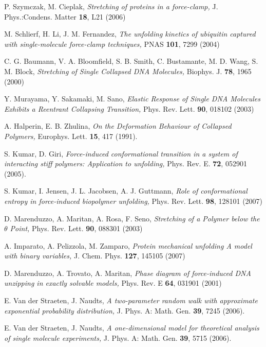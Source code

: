 \documentclass[doublecol,figures]{epl2}
\begin{document}
\begin{thebibliography}{99}
  P. Szymczak, M. Cieplak, {\sl Stretching of proteins in a
force-clamp,} J. Phys.:Condens. Matter {\bf 18}, L21 (2006)

 M. Schlierf, H. Li, J. M. Fernandez, {\sl The unfolding
kinetics of ubiquitin captured with single-molecule force-clamp techniques,}
PNAS {\bf 101}, 7299 (2004)

 C. G. Baumann, V. A. Bloomfield, S. B. Smith, C. Bustamante,
M. D. Wang, S. M. Block, {\sl Stretching of Single Collapsed DNA Molecules,}
Biophys. J. {\bf 78}, 1965 (2000)

 Y. Murayama, Y. Sakamaki, M. Sano, {\sl Elastic Response of
Single DNA Molecules Exhibits a Reentrant Collapsing Transition,} Phys. Rev.
Lett. {\bf 90}, 018102 (2003)

 A. Halperin, E. B. Zhulina, {\sl On the Deformation Behaviour
of Collapsed Polymers,} Europhys. Lett. {\bf 15}, 417 (1991).

 S. Kumar, D. Giri, {\sl Force-induced conformational
transition in a system of interacting stiff polymers: Application to unfolding,}
Phys. Rev. E. {\bf 72}, 052901 (2005).

 S. Kumar, I. Jensen, J. L. Jacobsen, A. J. Guttmann, {\sl
Role
of conformational entropy in force-induced biopolymer unfolding,} Phys. Rev.
Lett. {\bf 98}, 128101 (2007)

 D. Marenduzzo, A. Maritan, A. Rosa, F. Seno, {\sl Stretching
of a Polymer below the $\theta$ Point,} Phys. Rev. Lett. {\bf 90}, 088301 (2003)

 A. Imparato, A. Pelizzola, M. Zamparo, {\sl Protein mechanical unfolding A model with binary variables,} J. Chem. Phys. {\bf 127}, 145105 (2007)

 D. Marenduzzo, A. Trovato, A. Maritan, {\sl Phase diagram of force-induced DNA unzipping in exactly solvable models,} Phys. Rev. E {\bf 64}, 031901 (2001)

 E. Van der Straeten, J. Naudts,
{\sl A two-parameter random walk with approximate exponential probability
distribution,}
J. Phys. A: Math. Gen. {\bf 39}, 7245 (2006).

 E. Van der Straeten, J. Naudts,
{\sl A one-dimensional model for theoretical analysis of single molecule
experiments,}
J. Phys. A: Math. Gen. {\bf 39}, 5715 (2006).


\end{thebibliography}
\end{document}

